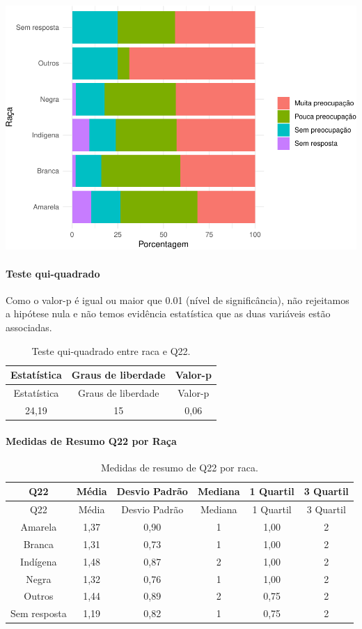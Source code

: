 \documentclass[]{article}
\let\oldparagraph\paragraph
\renewcommand{\paragraph}[1]{\oldparagraph{#1}\mbox{}}
\begin{document}
\begin{center}\includegraphics[width=0.75\linewidth]{relatorio_covid19_files/figure-latex/unnamed-chunk-516-1} \end{center}

\hypertarget{teste-qui-quadrado-45}{%
\paragraph{Teste qui-quadrado}\label{teste-qui-quadrado-45}}

Como o valor-p é igual ou maior que 0.01 (nível de significância), não rejeitamos a hipótese nula e não temos evidência estatística que as duas variáveis estão associadas.

\begin{longtable}[]{@{}ccc@{}}
\caption{\label{tab:unnamed-chunk-518}Teste qui-quadrado entre raca e Q22.}\tabularnewline
\toprule
Estatística & Graus de liberdade & Valor-p\tabularnewline
\midrule
\endfirsthead
\toprule
Estatística & Graus de liberdade & Valor-p\tabularnewline
\midrule
\endhead
24,19 & 15 & 0,06\tabularnewline
\bottomrule
\end{longtable}

\cleardoublepage

\hypertarget{medidas-de-resumo-q22-por-rauxe7a}{%
\paragraph{Medidas de Resumo Q22 por Raça}\label{medidas-de-resumo-q22-por-rauxe7a}}

\begin{longtable}[]{@{}cccccc@{}}
\caption{\label{tab:unnamed-chunk-519}Medidas de resumo de Q22 por raca.}\tabularnewline
\toprule
Q22 & Média & Desvio Padrão & Mediana & 1 Quartil & 3 Quartil\tabularnewline
\midrule
\endfirsthead
\toprule
Q22 & Média & Desvio Padrão & Mediana & 1 Quartil & 3 Quartil\tabularnewline
\midrule
\endhead
Amarela & 1,37 & 0,90 & 1 & 1,00 & 2\tabularnewline
Branca & 1,31 & 0,73 & 1 & 1,00 & 2\tabularnewline
Indígena & 1,48 & 0,87 & 2 & 1,00 & 2\tabularnewline
Negra & 1,32 & 0,76 & 1 & 1,00 & 2\tabularnewline
Outros & 1,44 & 0,89 & 2 & 0,75 & 2\tabularnewline
Sem resposta & 1,19 & 0,82 & 1 & 0,75 & 2\tabularnewline
\bottomrule
\end{longtable}
\end{document}
